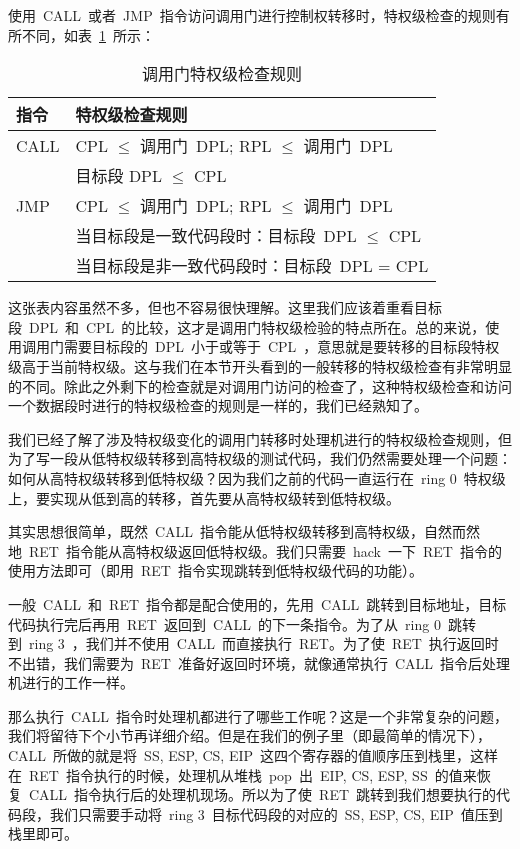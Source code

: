 使用~CALL~或者~JMP~指令访问调用门进行控制权转移时，特权级检查的规则有所不同，如表~\ref{callgate_rules}~所示：

\begin{center}\begin{longtable}{|l|l|}
\caption[]{调用门特权级检查规则}\label{callgate_rules}\\
\hline
\textbf{指令} & \textbf{特权级检查规则}\\
\hline
CALL & CPL $\le$ 调用门~DPL; RPL $\le$ 调用门~DPL\\
     & 目标段 DPL $\le$ CPL\\
\hline
JMP  & CPL $\le$ 调用门~DPL; RPL $\le$ 调用门~DPL\\
     & 当目标段是一致代码段时：目标段~DPL $\le$ CPL\\
     & 当目标段是非一致代码段时：目标段~DPL = CPL\\
\hline
\end{longtable}\end{center}

这张表内容虽然不多，但也不容易很快理解。这里我们应该着重看目标段~DPL~和~CPL~的比较，这才是调用门特权级检验的特点所在。总的来说，使用调用门需要目标段的~DPL~小于或等于~CPL~，意思就是要转移的目标段特权级高于当前特权级。这与我们在本节开头看到的一般转移的特权级检查有非常明显的不同。除此之外剩下的检查就是对调用门访问的检查了，这种特权级检查和访问一个数据段时进行的特权级检查的规则是一样的，我们已经熟知了。

我们已经了解了涉及特权级变化的调用门转移时处理机进行的特权级检查规则，但为了写一段从低特权级转移到高特权级的测试代码，我们仍然需要处理一个问题：如何从高特权级转移到低特权级？因为我们之前的代码一直运行在~ring 0~特权级上，要实现从低到高的转移，首先要从高特权级转到低特权级。

其实思想很简单，既然~CALL~指令能从低特权级转移到高特权级，自然而然地~RET~指令能从高特权级返回低特权级。我们只需要~hack~一下~RET~指令的使用方法即可（即用~RET~指令实现跳转到低特权级代码的功能）。

一般~CALL~和~RET~指令都是配合使用的，先用~CALL~跳转到目标地址，目标代码执行完后再用~RET~返回到~CALL~的下一条指令。为了从~ring 0~跳转到~ring 3~，我们并不使用~CALL~而直接执行~RET。为了使~RET~执行返回时不出错，我们需要为~RET~准备好返回时环境，就像通常执行~CALL~指令后处理机进行的工作一样。

那么执行~CALL~指令时处理机都进行了哪些工作呢？这是一个非常复杂的问题，我们将留待下个小节再详细介绍。但是在我们的例子里（即最简单的情况下），CALL~所做的就是将~SS, ESP, CS, EIP~这四个寄存器的值顺序压到栈里，这样在~RET~指令执行的时候，处理机从堆栈~pop~出~EIP, CS, ESP, SS~的值来恢复~CALL~指令执行后的处理机现场。所以为了使~RET~跳转到我们想要执行的代码段，我们只需要手动将~ring 3~目标代码段的对应的~SS, ESP, CS, EIP~值压到栈里即可。

